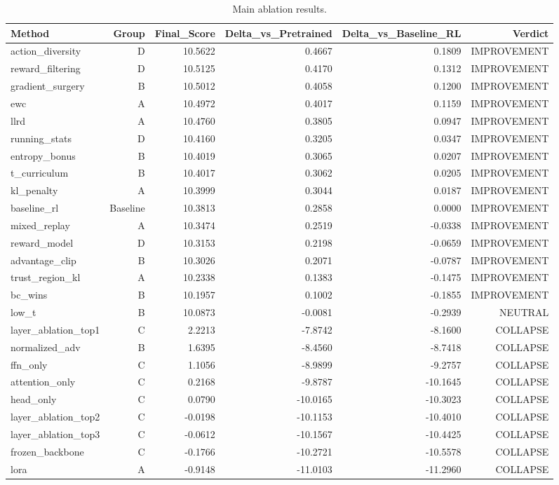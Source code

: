 \begin{table}[htbp]
\centering
\caption{Main ablation results.}
\label{tab:main_results}
\begin{tabular}{lrrrrr}
\toprule
\textbf{Method} & \textbf{Group} & \textbf{Final\_Score} & \textbf{Delta\_vs\_Pretrained} & \textbf{Delta\_vs\_Baseline\_RL} & \textbf{Verdict} \\
\midrule
action\_diversity & D & 10.5622 & 0.4667 & 0.1809 & IMPROVEMENT \\
reward\_filtering & D & 10.5125 & 0.4170 & 0.1312 & IMPROVEMENT \\
gradient\_surgery & B & 10.5012 & 0.4058 & 0.1200 & IMPROVEMENT \\
ewc & A & 10.4972 & 0.4017 & 0.1159 & IMPROVEMENT \\
llrd & A & 10.4760 & 0.3805 & 0.0947 & IMPROVEMENT \\
running\_stats & D & 10.4160 & 0.3205 & 0.0347 & IMPROVEMENT \\
entropy\_bonus & B & 10.4019 & 0.3065 & 0.0207 & IMPROVEMENT \\
t\_curriculum & B & 10.4017 & 0.3062 & 0.0205 & IMPROVEMENT \\
kl\_penalty & A & 10.3999 & 0.3044 & 0.0187 & IMPROVEMENT \\
baseline\_rl & Baseline & 10.3813 & 0.2858 & 0.0000 & IMPROVEMENT \\
mixed\_replay & A & 10.3474 & 0.2519 & -0.0338 & IMPROVEMENT \\
reward\_model & D & 10.3153 & 0.2198 & -0.0659 & IMPROVEMENT \\
advantage\_clip & B & 10.3026 & 0.2071 & -0.0787 & IMPROVEMENT \\
trust\_region\_kl & A & 10.2338 & 0.1383 & -0.1475 & IMPROVEMENT \\
bc\_wins & B & 10.1957 & 0.1002 & -0.1855 & IMPROVEMENT \\
low\_t & B & 10.0873 & -0.0081 & -0.2939 & NEUTRAL \\
layer\_ablation\_top1 & C & 2.2213 & -7.8742 & -8.1600 & COLLAPSE \\
normalized\_adv & B & 1.6395 & -8.4560 & -8.7418 & COLLAPSE \\
ffn\_only & C & 1.1056 & -8.9899 & -9.2757 & COLLAPSE \\
attention\_only & C & 0.2168 & -9.8787 & -10.1645 & COLLAPSE \\
head\_only & C & 0.0790 & -10.0165 & -10.3023 & COLLAPSE \\
layer\_ablation\_top2 & C & -0.0198 & -10.1153 & -10.4010 & COLLAPSE \\
layer\_ablation\_top3 & C & -0.0612 & -10.1567 & -10.4425 & COLLAPSE \\
frozen\_backbone & C & -0.1766 & -10.2721 & -10.5578 & COLLAPSE \\
lora & A & -0.9148 & -11.0103 & -11.2960 & COLLAPSE \\
\bottomrule
\end{tabular}
\end{table}